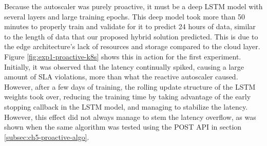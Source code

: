 \begin{center}
\begin{minipage}{\linewidth}
    \label{fig:exp1-proactive-k8s}
\end{minipage}
\end{center}

Because the autoscaler was purely proactive, it must be a deep LSTM model with several layers and large training epochs. This deep model took more than 50 minutes to properly train and validate for it to predict 24 hours of data, similar to the length of data that our proposed hybrid solution predicted. This is due to the edge architecture's lack of resources and storage compared to the cloud layer. Figure \ref{fig:exp1-proactive-k8s} shows this in action for the first experiment. Initially, it was observed that the latency continually spiked, causing a large amount of SLA violations, more than what the reactive autoscaler caused. However, after a few days of training, the rolling update structure of the LSTM weights took over, reducing the training time by taking advantage of the early stopping callback in the LSTM model, and managing to stabilize the latency. However, this effect did not always manage to stem the latency overflow, as was shown when the same algorithm was tested using the POST API in section \ref{subsec:ch5-proactive-algo}.

